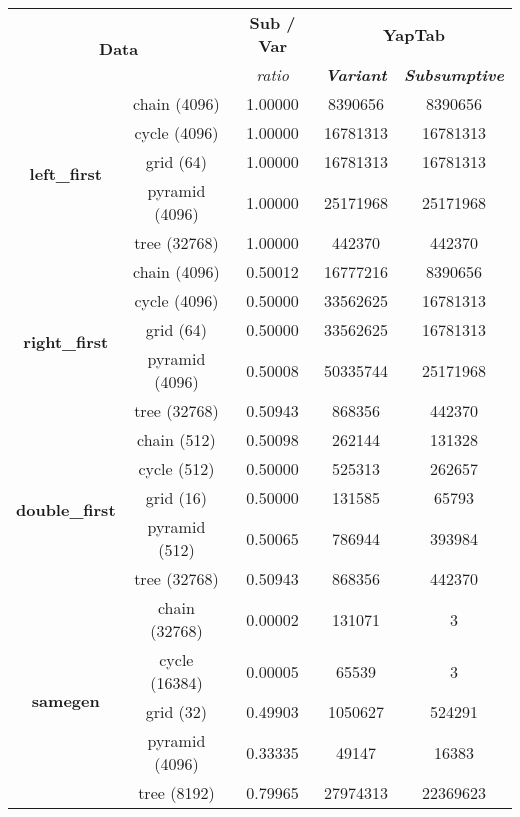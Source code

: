 \begin{table}[ht]
\centering
\footnotesize{
  \begin{tabular}{cc|c|cc}
   \hline
    \hline
    \multicolumn{2}{c|}{\multirow{2}{*}{\small{\textbf{Data}}}} & \textbf{\small{Sub / Var}} & \multicolumn{2}{c}{\small{\textbf{YapTab}}} \\
     \multicolumn{2}{c|}{} & \scriptsize{\textit{ratio}} & \textbf{\textit{\scriptsize{Variant}}} & \textbf{\textit{\scriptsize{Subsumptive}}} \\
   \hline
   \hline
   \multirow{5}{*}{\textbf{left\_first}} &  chain (4096) &  1.00000 &  8390656 & 8390656
   \\
   &  cycle (4096) &  1.00000 &  16781313 & 16781313
   \\
   &  grid (64) &  1.00000 &  16781313 & 16781313
   \\
   &  pyramid (4096) &  1.00000 &  25171968 & 25171968
   \\
   &  tree (32768) &  1.00000 &  442370 & 442370
   \\
   \hline
   
   \multirow{5}{*}{\textbf{right\_first}} &  chain (4096) &  0.50012 &  16777216 & 8390656
   \\
   &  cycle (4096) &  0.50000 &  33562625 & 16781313
   \\
   &  grid (64) &  0.50000 &  33562625 & 16781313
   \\
   &  pyramid (4096) &  0.50008 &  50335744 & 25171968
   \\
   &  tree (32768) &  0.50943 &  868356 & 442370
   \\
   \hline
\multirow{5}{*}{\textbf{double\_first}} &  chain (512) &  0.50098 &  262144 & 131328
\\
&  cycle (512) &  0.50000 &  525313 & 262657
\\
&  grid (16) &  0.50000 &  131585 & 65793
\\
&  pyramid (512) &  0.50065 &  786944 & 393984
\\
&  tree (32768) &  0.50943 &  868356 & 442370
\\
\hline

\multirow{5}{*}{\textbf{samegen}} &  chain (32768) &  0.00002 &  131071 & 3
\\
&  cycle (16384) &  0.00005 &  65539 & 3
\\
&  grid (32) &  0.49903 &  1050627 & 524291
\\
&  pyramid (4096) &  0.33335 &  49147 & 16383
\\
&  tree (8192) &  0.79965 &  27974313 & 22369623
\\
\hline


\end{tabular}}
\end{table}
